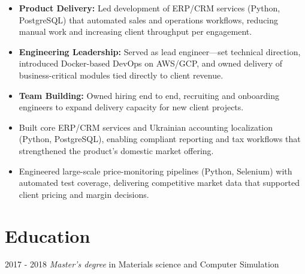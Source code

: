 \documentclass{resume}
\begin{document}

\begin{itemize}
  \item \textbf{Product Delivery:} Led development of ERP/CRM services (Python, PostgreSQL) that automated sales and operations workflows, reducing manual work and increasing client throughput per engagement.
  \item \textbf{Engineering Leadership:} Served as lead engineer---set technical direction, introduced Docker-based DevOps on AWS/GCP, and owned delivery of business-critical modules tied directly to client revenue.
  \item \textbf{Team Building:} Owned hiring end to end, recruiting and onboarding engineers to expand delivery capacity for new client projects.
\end{itemize}


\begin{itemize}
  \item Built core ERP/CRM services and Ukrainian accounting localization (Python, PostgreSQL), enabling compliant reporting and tax workflows that strengthened the product's domestic market offering.
\end{itemize}


\begin{itemize}
  \item Engineered large-scale price-monitoring pipelines (Python, Selenium) with automated test coverage, delivering competitive market data that supported client pricing and margin decisions.
\end{itemize}

\section{Education}
 {2017 - 2018}
\textit{Master's degree} in Materials science and Computer Simulation
\end{document}
